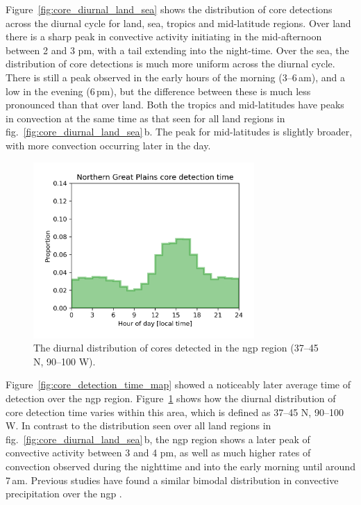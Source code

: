 Figure~\ref{fig:core_diurnal_land_sea} shows the distribution of core detections across the diurnal cycle for land, sea, tropics and mid-latitude regions.
Over land there is a sharp peak in convective activity initiating in the mid-afternoon between 2 and 3 pm, with a tail extending into the night-time.
Over the sea, the distribution of core detections is much more uniform across the diurnal cycle.
There is still a peak observed in the early hours of the morning (3--6\,am), and a low in the evening (6\,pm), but the difference between these is much less pronounced than that over land.
Both the tropics and mid-latitudes have peaks in convection at the same time as that seen for all land regions in fig.~\ref{fig:core_diurnal_land_sea}\,b.
The peak for mid-latitudes is slightly broader, with more convection occurring later in the day.

\begin{figure}[tp]
    \centering
    \includegraphics[width=0.75\textwidth]{figures/chapter2_13.png}
    \caption[
    The diurnal distribution of cores detected in the \acrshort{ngp} region
    ]{
    The diurnal distribution of cores detected in the \acrshort{ngp} region (37--45\,\textdegree\,N, 90--100\,\textdegree\,W).
    }
    \label{fig:core_ngp_contrast}
\end{figure}

Figure~\ref{fig:core_detection_time_map} showed a noticeably later average time of detection over the \acrfull{ngp} region.
Figure~\ref{fig:core_ngp_contrast} shows how the diurnal distribution of core detection time varies within this area, which is defined as 37--45\,\textdegree\,N, 90--100\,\textdegree\,W.
In contrast to the distribution seen over all land regions in fig.~\ref{fig:core_diurnal_land_sea}\,b, the \acrshort{ngp} region shows a later peak of convective activity between 3 and 4 pm, as well as much higher rates of convection observed during the nighttime and into the early morning until around 7\,am.
Previous studies have found a similar bimodal distribution in convective precipitation over the \acrshort{ngp} \citet{li_high-resolution_2021}.

